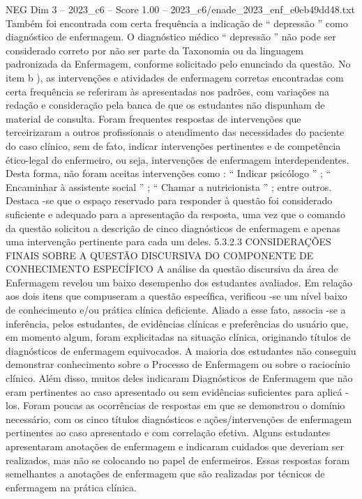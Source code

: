 \begin{textsample}{NEG Dim 3 – 2023\_c6 – Score 1.00 – 2023\_c6/enade\_2023\_enf\_e0eb49dd48.txt}
Também foi encontrada com certa frequência a indicação de “ depressão ” como diagnóstico de enfermagem.
O diagnóstico médico “ depressão ” não pode ser considerado correto por não ser parte da Taxonomia ou da linguagem padronizada da Enfermagem, conforme solicitado pelo enunciado da questão.
No item b ), as intervenções e atividades de enfermagem corretas encontradas com certa frequência se referiram às apresentadas nos padrões, com variações na redação e consideração pela banca de que os estudantes não dispunham de material de consulta.
Foram frequentes respostas de intervenções que terceirizaram a outros profissionais o atendimento das necessidades do paciente do caso clínico, sem de fato, indicar intervenções pertinentes e de competência ético-legal do enfermeiro, ou seja, intervenções de enfermagem interdependentes.
Desta forma, não foram aceitas intervenções como : “ Indicar psicólogo ” ; “ Encaminhar à assistente social ” ; “ Chamar a nutricionista ” ; entre outros.
Destaca -se que o espaço reservado para responder à questão foi considerado suficiente e adequado para a apresentação da resposta, uma vez que o comando da questão solicitou a descrição de cinco diagnósticos de enfermagem e apenas uma intervenção pertinente para cada um deles. 5.3.2.3 CONSIDERAÇÕES FINAIS SOBRE A QUESTÃO DISCURSIVA DO COMPONENTE DE CONHECIMENTO ESPECÍFICO A análise da questão discursiva da área de Enfermagem revelou um baixo desempenho dos estudantes avaliados.
Em relação aos dois itens que compuseram a questão específica, verificou -se um nível baixo de conhecimento e/ou prática clínica deficiente.
Aliado a esse fato, associa -se a inferência, pelos estudantes, de evidências clínicas e preferências do usuário que, em momento algum, foram explicitadas na situação clínica, originando títulos de diagnósticos de enfermagem equivocados.
A maioria dos estudantes não conseguiu demonstrar conhecimento sobre o Processo de Enfermagem ou sobre o raciocínio clínico.
Além disso, muitos deles indicaram Diagnósticos de Enfermagem que não eram pertinentes ao caso apresentado ou sem evidências suficientes para aplicá -los.
Foram poucas as ocorrências de respostas em que se demonstrou o domínio necessário, com os cinco títulos diagnósticos e ações/intervenções de enfermagem pertinentes ao caso apresentado e com correlação efetiva.
Alguns estudantes apresentaram anotações de enfermagem e indicaram cuidados que deveriam ser realizados, mas não se colocando no papel de enfermeiros.
Essas respostas foram semelhantes a anotações de enfermagem que são realizadas por técnicos de enfermagem na prática clínica.

\end{textsample}
